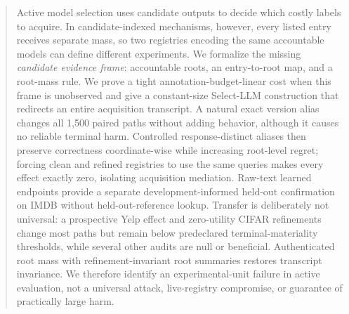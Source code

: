 \begin{abstract}
Active model selection uses candidate outputs to decide which costly labels to acquire. In candidate-indexed mechanisms, however, every listed entry receives separate mass, so two registries encoding the same accountable models can define different experiments. We formalize the missing \emph{candidate evidence frame}: accountable roots, an entry-to-root map, and a root-mass rule. We prove a tight annotation-budget-linear cost when this frame is unobserved and give a constant-size Select-LLM construction that redirects an entire acquisition transcript. A natural exact version alias changes all 1,500 paired paths without adding behavior, although it causes no reliable terminal harm. Controlled response-distinct aliases then preserve correctness coordinate-wise while increasing root-level regret; forcing clean and refined registries to use the same queries makes every effect exactly zero, isolating acquisition mediation. Raw-text learned endpoints provide a separate development-informed held-out confirmation on IMDB without held-out-reference lookup. Transfer is deliberately not universal: a prospective Yelp effect and zero-utility CIFAR refinements change most paths but remain below predeclared terminal-materiality thresholds, while several other audits are null or beneficial. Authenticated root mass with refinement-invariant root summaries restores transcript invariance. We therefore identify an experimental-unit failure in active evaluation, not a universal attack, live-registry compromise, or guarantee of practically large harm.
\end{abstract}
